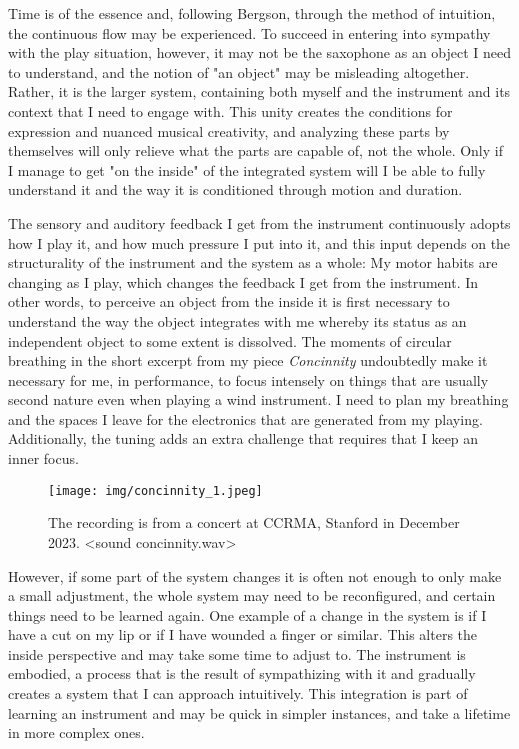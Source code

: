 \documentclass[11pt]{article}
\begin{document}
Time is of the essence and, following Bergson, through the method of intuition, the continuous flow may be experienced.
To succeed in entering into sympathy with the play situation, however, it may not be the saxophone as an object I need to understand, and the notion of "an object" may be misleading altogether.
Rather, it is the larger system, containing both myself and the instrument and its context that I need to engage with.
This unity creates the conditions for expression and nuanced musical creativity, and analyzing these parts by themselves will only relieve what the parts are capable of, not the whole.
Only if I manage to get "on the inside" of the integrated system will I be able to fully understand it and the way it is conditioned through motion and duration.

The sensory and auditory feedback I get from the instrument continuously adopts how I play it, and how much pressure I put into it, and this input depends on the structurality of the instrument and the system as a whole: My motor habits are changing as I play, which changes the feedback I get from the instrument.
In other words, to perceive an object from the inside it is first necessary to understand the way the object integrates with me whereby its status as an independent object to some extent is dissolved.
The moments of circular breathing in the short excerpt from my piece \emph{Concinnity} undoubtedly make it necessary for me, in performance, to focus intensely on things that are usually second nature even when playing a wind instrument.
I need to plan my breathing and the spaces I leave for the electronics that are generated from my playing. Additionally, the tuning adds an extra challenge that requires that I keep an inner focus.

\begin{figure}[htbp]
\centering
\texttt{[image: img/concinnity\_1.jpeg]}
\caption{\label{fig:org6685d43}The recording is from a concert at CCRMA, Stanford in December 2023. <sound concinnity.wav>}
\end{figure}

However, if some part of the system changes it is often not enough to only make a small adjustment, the whole system may need to be reconfigured, and certain things need to be learned again.
One example of a change in the system is if I have a cut on my lip or if I have wounded a finger or similar.
This alters the inside perspective and may take some time to adjust to.
The instrument is embodied, a process that is the result of sympathizing with it and gradually creates a system that I can approach intuitively.
This integration is part of learning an instrument and may be quick in simpler instances, and take a lifetime in more complex ones.
\end{document}
